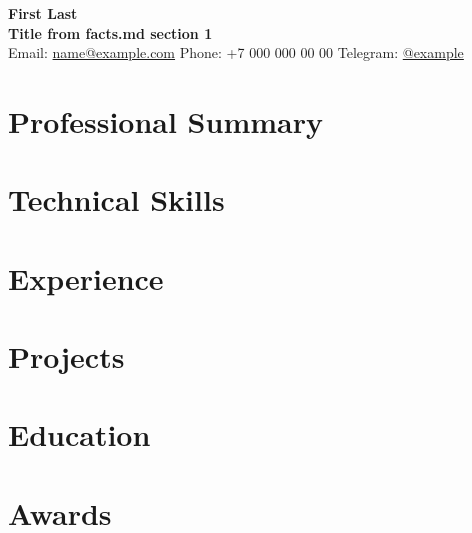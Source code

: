 \documentclass[a4paper,10pt]{article}
\makeatletter
\newcommand{\CVName}{First Last}
\newcommand{\CVTitle}{Title from facts.md section 1}
\newcommand{\CVEmail}{name@example.com}
\newcommand{\CVPhone}{+7 000 000 00 00}
\newcommand{\CVTelegram}{example}
\makeatother
\begin{document}
{\LARGE \textbf{\CVName}}\\
\textbf{\CVTitle}\\
Email: \href{mailto:\CVEmail}{\CVEmail} \quad
Phone: \CVPhone \quad
Telegram: \href{https://t.me/\CVTelegram}{@\CVTelegram}

\section*{Professional Summary}

\section*{Technical Skills}

\section*{Experience}

\section*{Projects}

\section*{Education}

\section*{Awards}
\end{document}
